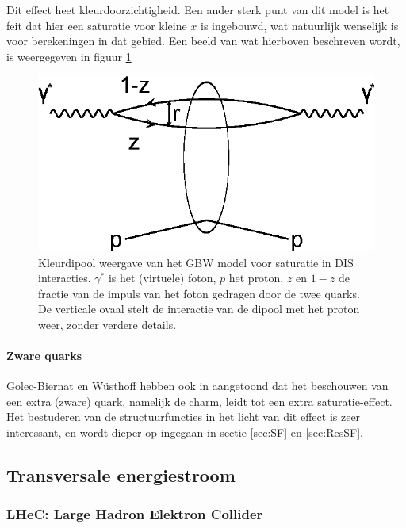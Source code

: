 \documentclass[a4paper,11pt]{article}
\numberwithin{equation}{section} %
\begin{document}
Dit effect heet kleurdoorzichtigheid.
Een ander sterk punt van dit model is het feit dat hier een saturatie voor kleine $x$ is ingebouwd, wat natuurlijk wenselijk is voor berekeningen in dat gebied.
Een beeld van wat hierboven beschreven wordt, is weergegeven in figuur \ref{fig:GBW}
\begin{figure} [H]
  \begin{center}
    \includegraphics[width=.66\textwidth]{Afbeeldingen/GBW.eps}
    \caption{Kleurdipool weergave van het GBW model voor saturatie in DIS interacties. $\gamma^*$ is het (virtuele) foton, $p$ het proton, $z$ en $1-z$ de fractie van de impuls van het foton gedragen door de twee quarks. De verticale ovaal stelt de interactie van de dipool met het proton weer, zonder verdere details. \cite{ET}}
   \label{fig:GBW}
  \end{center}
\end{figure}

      \paragraph{Zware quarks}
Golec-Biernat en Wüsthoff hebben ook in \cite{GBW} aangetoond dat het beschouwen van een extra (zware) quark, namelijk de charm, leidt tot een extra saturatie-effect.
Het bestuderen van de structuurfuncties in het licht van dit effect is zeer interessant, en wordt dieper op ingegaan in sectie \ref{sec:SF} en \ref{sec:ResSF}.

  \subsection{Transversale energiestroom}
    \subsubsection{LHeC: Large Hadron Elektron Collider}
\end{document}
